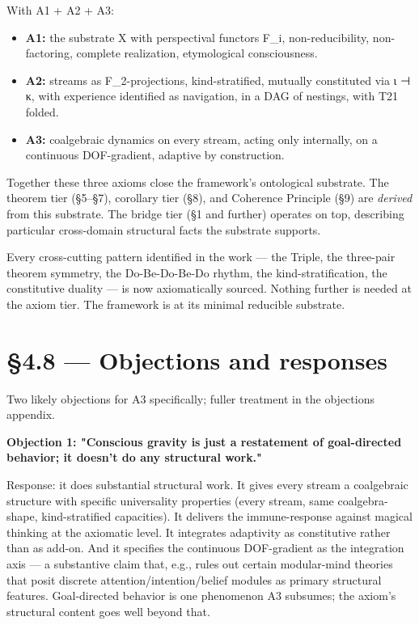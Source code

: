 \documentclass[11pt, openany]{book}
\newcommand{\sectionbreak}{\clearpage}
\begin{document}
With A1 + A2 + A3:
\begin{itemize}
\item \textbf{A1:} the substrate X with perspectival functors F\_\allowbreak{}i, non-reducibility, non-factoring, complete realization, etymological consciousness.
\item \textbf{A2:} streams as F\_\allowbreak{}2-projections, kind-stratified, mutually constituted via ι ⊣ κ, with experience identified as navigation, in a DAG of nestings, with T21 folded.
\item \textbf{A3:} coalgebraic dynamics on every stream, acting only internally, on a continuous DOF-gradient, adaptive by construction.
\end{itemize}

Together these three axioms close the framework's ontological substrate. The theorem tier (§5–§7), corollary tier (§8), and Coherence Principle (§9) are \textit{derived} from this substrate. The bridge tier (§1 and further) operates on top, describing particular cross-domain structural facts the substrate supports.

Every cross-cutting pattern identified in the work --- the Triple, the three-pair theorem symmetry, the Do-Be-Do-Be-Do rhythm, the kind-stratification, the constitutive duality --- is now axiomatically sourced. Nothing further is needed at the axiom tier. The framework is at its minimal reducible substrate.

\sectionbreak

\section{§4.8 --- Objections and responses}

Two likely objections for A3 specifically; fuller treatment in the objections appendix.

\textbf{Objection 1: "Conscious gravity is just a restatement of goal-directed behavior; it doesn't do any structural work."}

Response: it does substantial structural work. It gives every stream a coalgebraic structure with specific universality properties (every stream, same coalgebra-shape, kind-stratified capacities). It delivers the immune-response against magical thinking at the axiomatic level. It integrates adaptivity as constitutive rather than as add-on. And it specifies the continuous DOF-gradient as the integration axis --- a substantive claim that, e.g., rules out certain modular-mind theories that posit discrete attention/intention/belief modules as primary structural features. Goal-directed behavior is one phenomenon A3 subsumes; the axiom's structural content goes well beyond that.
\end{document}
